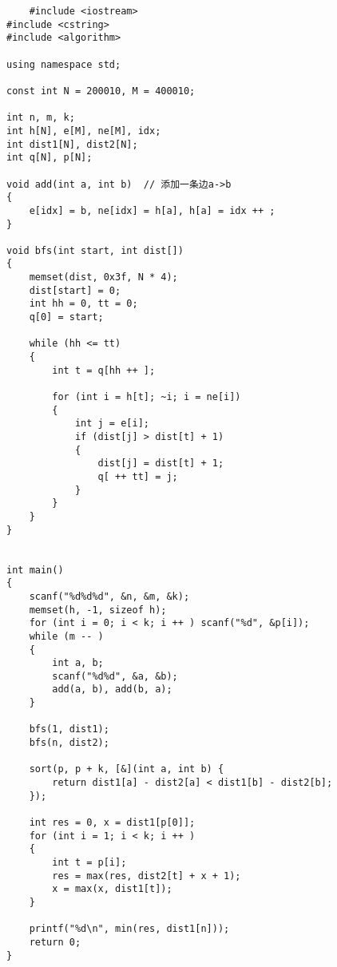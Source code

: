 \documentclass[cyan,pad,cn]{elegantnote}
\begin{document}
\begin{lstlisting}
    #include <iostream>
#include <cstring>
#include <algorithm>

using namespace std;

const int N = 200010, M = 400010;

int n, m, k;
int h[N], e[M], ne[M], idx;
int dist1[N], dist2[N];
int q[N], p[N];

void add(int a, int b)  // 添加一条边a->b
{
    e[idx] = b, ne[idx] = h[a], h[a] = idx ++ ;
}

void bfs(int start, int dist[])
{
    memset(dist, 0x3f, N * 4);
    dist[start] = 0;
    int hh = 0, tt = 0;
    q[0] = start;

    while (hh <= tt)
    {
        int t = q[hh ++ ];

        for (int i = h[t]; ~i; i = ne[i])
        {
            int j = e[i];
            if (dist[j] > dist[t] + 1)
            {
                dist[j] = dist[t] + 1;
                q[ ++ tt] = j;
            }
        }
    }
}


int main()
{
    scanf("%d%d%d", &n, &m, &k);
    memset(h, -1, sizeof h);
    for (int i = 0; i < k; i ++ ) scanf("%d", &p[i]);
    while (m -- )
    {
        int a, b;
        scanf("%d%d", &a, &b);
        add(a, b), add(b, a);
    }

    bfs(1, dist1);
    bfs(n, dist2);

    sort(p, p + k, [&](int a, int b) {
        return dist1[a] - dist2[a] < dist1[b] - dist2[b];
    });

    int res = 0, x = dist1[p[0]];
    for (int i = 1; i < k; i ++ )
    {
        int t = p[i];
        res = max(res, dist2[t] + x + 1);
        x = max(x, dist1[t]);
    }

    printf("%d\n", min(res, dist1[n]));
    return 0;
}

\end{lstlisting}
\end{document}
